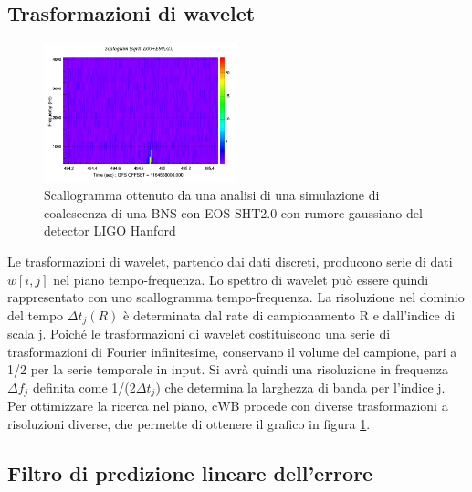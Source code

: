 \subsection{Trasformazioni di wavelet}
\label{subsection:wavelet_transform}
\begin{figure}
	\vspace{-15pt}
	\begin{center}
		\includegraphics[width=0.5\textwidth]{figures/Capitolo_3/L1_scalogram_0.png}
	\end{center}
	\vspace{-5pt}
	\caption{Scallogramma ottenuto da una analisi di una simulazione di coalescenza di una BNS con EOS SHT2.0 con rumore gaussiano del detector LIGO Hanford}
	\label{fig:scalogram_example}
	\vspace{-40pt}
\end{figure}
Le trasformazioni di wavelet, partendo dai dati discreti, producono serie di dati $w[i,j]$ nel piano tempo-frequenza. Lo spettro di wavelet può essere quindi rappresentato con uno scallogramma tempo-frequenza. La risoluzione nel dominio del tempo $\Delta t_j(R)$ è determinata dal rate di campionamento R e dall'indice di scala j. Poiché le trasformazioni di wavelet costituiscono una serie di trasformazioni di Fourier infinitesime, conservano il volume del campione, pari a 1/2 per la serie temporale in input. Si avrà quindi una risoluzione in frequenza $\Delta f_j$ definita come 1/(2$\Delta t_j$) che determina la larghezza di banda per l'indice j. Per ottimizzare la ricerca nel piano, cWB procede con diverse trasformazioni a risoluzioni diverse, che permette di ottenere il grafico in figura \ref{fig:scalogram_example}.
\subsection{Filtro di predizione lineare dell'errore}




